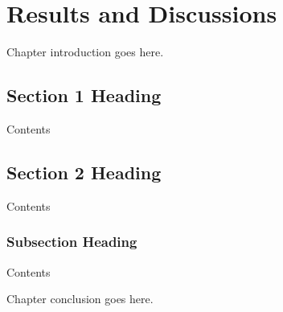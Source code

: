 \chapter{Results and Discussions}
	
Chapter introduction goes here.	
\section{Section 1 Heading}

Contents

\section{Section 2 Heading}

Contents

\subsection{Subsection Heading}

Contents

Chapter conclusion goes here.